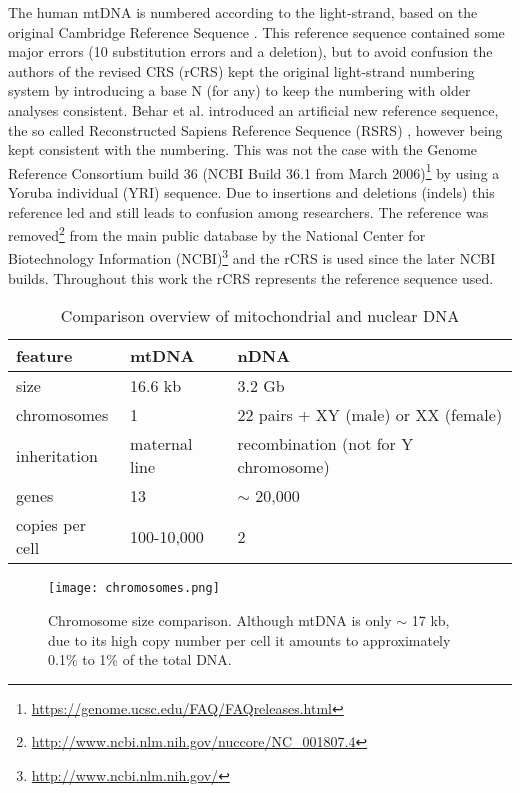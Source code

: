 The human mtDNA is numbered according to the light-strand, based on the original Cambridge Reference Sequence \cite{Anderson1981}. This reference sequence contained some major errors (10 substitution errors and a deletion), but to avoid confusion the authors of the revised CRS (rCRS) \cite{Andrews1999} kept the original light-strand numbering system by introducing a base N (for any) to keep the numbering with older analyses consistent. Behar et al. \cite{Behar2012} introduced an artificial new reference sequence, the so called Reconstructed Sapiens Reference Sequence (RSRS) \cite{Bandelt2013}, however being kept consistent with the numbering. This was not the case with the Genome Reference Consortium build 36 (NCBI Build 36.1 from March 2006)\footnote{\url{https://genome.ucsc.edu/FAQ/FAQreleases.html}} by using a Yoruba individual (YRI) sequence. Due to insertions and deletions (indels) this reference led and still leads to confusion among researchers. The reference was removed\footnote{\url{http://www.ncbi.nlm.nih.gov/nuccore/NC_001807.4}} from the main public database by the National Center for Biotechnology Information (NCBI)\footnote{\url{http://www.ncbi.nlm.nih.gov/}} and the rCRS is used since the later NCBI builds. Throughout this work the rCRS represents the reference sequence used. 
\begin{table}[ht]
  \begin{tabular}{lll}
     \toprule
    feature  & mtDNA & nDNA \\ 
		\midrule
    size & 16.6 kb & 3.2 Gb  \\ 
		chromosomes & 1 & 22 pairs + XY (male) or XX (female)\\ 
    inheritation & maternal line & recombination (not for Y chromosome) \\ 

		genes & 13 & $\sim$ 20,000 \\ 
		copies per cell & 100-10,000 & 2 \\ 
		\bottomrule
    \end{tabular}
    \caption[Comparison overview mtDNA and nDNA]{Comparison overview of mitochondrial and nuclear DNA }
    \label{tab:features}
\end{table}

\begin{figure}[ht]
\begin{center}
\texttt{[image: chromosomes.png]}
\caption[Chromosome size comparison]{Chromosome size comparison. Although mtDNA is only $\sim$ 17 kb, due to its high copy number per cell it amounts to approximately 0.1\% to 1\% of the total DNA.}
\label{fig:figureChromosomes}
\end{center}

\end{figure}

